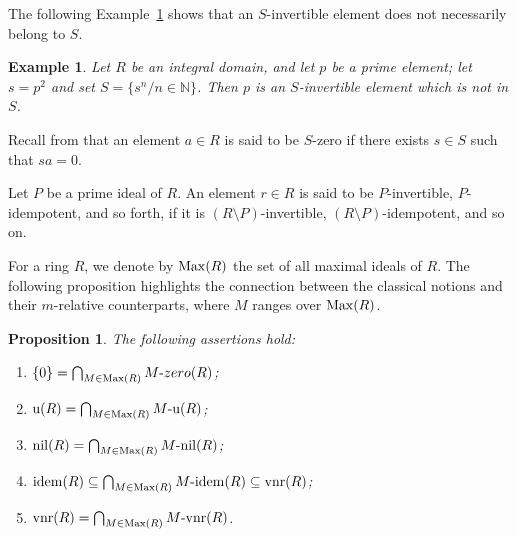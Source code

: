 \documentclass[12pt]{article}
\newtheorem{prop}[thm]{\bf Proposition}
\newtheorem{exmp}[thm]{\bf Example}
\newcommand{\field}[1]{\mathbb{#1}}
\newcommand{\N }{\field{N}}
\def\u{\mathrm{u}}
\def\idem{{\rm idem}}
\def\nil{{\rm nil}}
\def\vnr{{\rm vnr}}
\def\z{{zero}}
\def\Max{{\rm Max}}
\begin{document}
The following Example~\ref{2exmp-} shows that an \( S \)-invertible element does not necessarily belong to \( S \).

\begin{exmp}\label{2exmp-}  
  Let $R$ be an integral domain, and let $p$ be a prime element; let $s=p^2$ and set $S=\{s^n/n \in  \N\}$. Then $p$ is an $S$-invertible element which is not in $S$. 
 \end{exmp}
Recall from \cite{Ers1} that an element \( a \in R \) is said to be \( S \)-zero if there exists \( s \in S \) such that \( sa = 0 \).


Let \( P \) be a prime ideal of \( R \). An element \( r \in R \) is said to be \( P \)-invertible, \( P \)-idempotent, and so forth, if it is \( (R \setminus P) \)-invertible, \( (R \setminus P) \)-idempotent, and so on.

For a ring $R$, we denote by $\Max(R)$ the set of all maximal ideals of $R$. The following proposition highlights the connection between the classical notions and their \( m \)-relative counterparts, where \( M \) ranges over \( \Max(R) \).

\begin{prop}
The following assertions hold:
\begin{enumerate}
    \item \( \{0\} = \bigcap_{M \in \Max(R)} M\text{-}\z(R) \);
    \item \( \u(R) = \bigcap_{M \in \Max(R)} M\text{-}\u(R) \);
    \item \( \nil(R) = \bigcap_{M \in \Max(R)} M\text{-}\nil(R) \);
    \item \( \idem(R) \subseteq \bigcap_{M \in \Max(R)} M\text{-}\idem(R) \subseteq \vnr(R) \);
    \item \( \vnr(R) = \bigcap_{M \in \Max(R)} M\text{-}\vnr(R) \).
\end{enumerate}
\end{prop}
\end{document}
